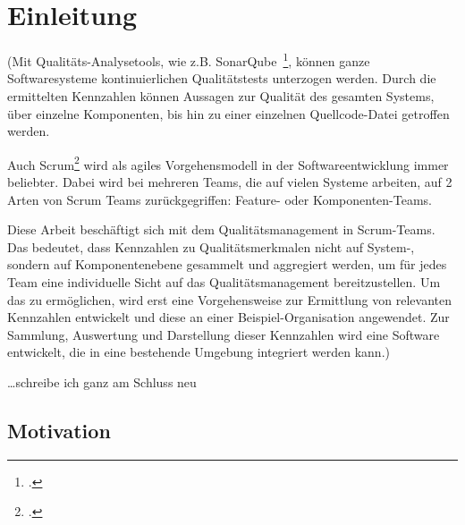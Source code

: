 \chapter{Einleitung}

(Mit Qualitäts-Analysetools, wie z.B. SonarQube~\footcite{sonarqube}, können ganze Softwaresysteme kontinuierlichen Qualitätstests unterzogen werden.
Durch die ermittelten Kennzahlen können Aussagen zur Qualität des gesamten Systems, über einzelne Komponenten, bis hin zu einer einzelnen Quellcode-Datei getroffen werden.

Auch Scrum\footcite{scrum} wird als agiles Vorgehensmodell in der Softwareentwicklung immer beliebter. 
Dabei wird bei mehreren Teams, die auf vielen Systeme arbeiten, auf 2 Arten von Scrum Teams zurückgegriffen:
Feature- oder Komponenten-Teams.

Diese Arbeit beschäftigt sich mit dem Qualitätsmanagement in Scrum-Teams.
Das bedeutet, dass Kennzahlen zu Qualitätsmerkmalen nicht auf System-, sondern auf Komponentenebene gesammelt und aggregiert werden, um für jedes Team eine individuelle Sicht auf das Qualitätsmanagement bereitzustellen.
Um das zu ermöglichen, wird erst eine Vorgehensweise zur Ermittlung von relevanten Kennzahlen entwickelt und diese an einer Beispiel-Organisation angewendet.
Zur Sammlung, Auswertung und Darstellung dieser Kennzahlen wird eine Software entwickelt, die in eine bestehende Umgebung integriert werden kann.)

\ldots schreibe ich ganz am Schluss neu

\section{Motivation}
